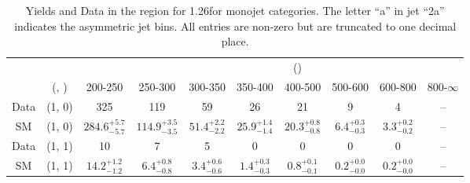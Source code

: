 \begin{table}[h!]
\tiny
\centering
\caption{Yields and Data in the \mmj region for 1.26\ifb for monojet categories. The letter ``a'' in jet \eg ``2a''  indicates the asymmetric jet bins. All entries are non-zero but are truncated to one decimal place.\label{tab:yieldsall_mumu_comb_mono}}
\begin{tabular}
{cccccccccc}
	\hline\hline
&	&	& \multicolumn{8}{c}{\scalht (\gev)}\\ 
	&	 (\njet, \nb) & 200-250 & 250-300 & 300-350 & 350-400 & 400-500 & 500-600 & 600-800 & 800-$\infty$ \\ [0.8ex] 
\hline
	Data & (1, 0) & 325 & 119 & 59 & 26 & 21 & 9 & 4 & -- \\[0.5ex] 
	SM & (1, 0) & $284.6^{+ 5.7 }_{- 5.7 }$ & $114.9^{+ 3.5 }_{- 3.5 }$ & $51.4^{+ 2.2 }_{- 2.2 }$ & $25.9^{+ 1.4 }_{- 1.4 }$ & $20.3^{+ 0.8 }_{- 0.8 }$ & $6.4^{+ 0.3 }_{- 0.3 }$ & $3.3^{+ 0.2 }_{- 0.2 }$ & -- \\[0.5ex] 
	Data & (1, 1) & 10 & 7 & 5 & 0 & 0 & 0 & 0 & -- \\[0.5ex] 
	SM & (1, 1) & $14.2^{+ 1.2 }_{- 1.2 }$ & $6.4^{+ 0.8 }_{- 0.8 }$ & $3.4^{+ 0.6 }_{- 0.6 }$ & $1.4^{+ 0.3 }_{- 0.3 }$ & $0.8^{+ 0.1 }_{- 0.1 }$ & $0.2^{+ 0.0 }_{- 0.0 }$ & $0.2^{+ 0.0 }_{- 0.0 }$ & -- \\[0.5ex] 
	\hline
	\hline
\end{tabular}
\end{table}
